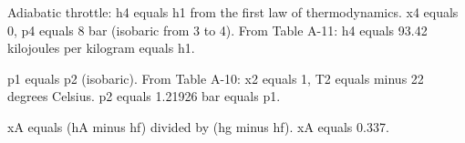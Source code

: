 Adiabatic throttle: h4 equals h1 from the first law of thermodynamics.  
x4 equals 0, p4 equals 8 bar (isobaric from 3 to 4).  
From Table A-11:  
h4 equals 93.42 kilojoules per kilogram equals h1.  

p1 equals p2 (isobaric).  
From Table A-10:  
x2 equals 1, T2 equals minus 22 degrees Celsius.  
p2 equals 1.21926 bar equals p1.  

xA equals (hA minus hf) divided by (hg minus hf).  
xA equals 0.337.